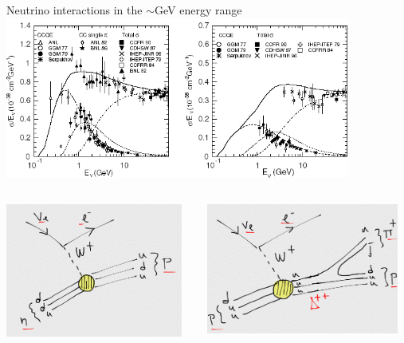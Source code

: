 \begin{frame}{Neutrino interactions in the $\sim$GeV energy range}
\centering
\includegraphics[width=0.85\textwidth]{./images/nuint/general/vNxsec.png}\\
\begin{columns}
  \begin{column}{0.33\textwidth}
    \includegraphics[width=0.95\textwidth]{./images/nuint/feyn/qe.png}
  \end{column}
  \begin{column}{0.33\textwidth}
    \includegraphics[width=0.95\textwidth]{./images/nuint/feyn/res.png}

\end{column}
\end{columns}
\end{frame}
